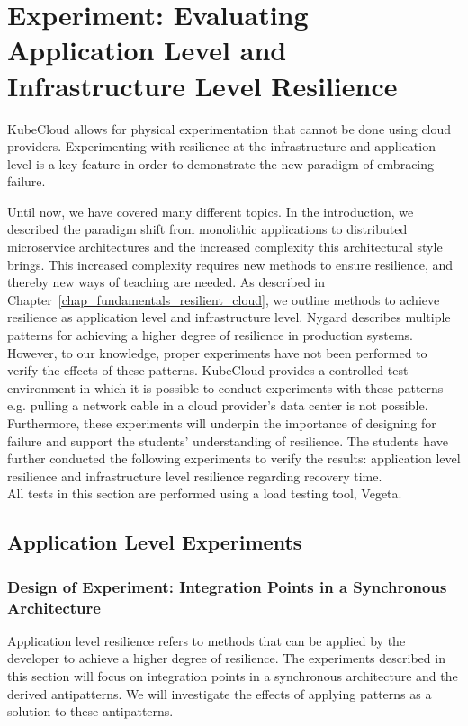 \chapter{Experiment: Evaluating Application Level and Infrastructure Level Resilience}
\label{chapter_experiment2_resilience}

\begin{theorem}
KubeCloud allows for physical experimentation that cannot be done using cloud providers.
Experimenting with resilience at the infrastructure and application level is a key feature in order to demonstrate the new paradigm of embracing failure.
\end{theorem}

\noindent
Until now, we have covered many different topics. In the introduction, we described the paradigm shift from monolithic applications to distributed microservice architectures and the increased complexity this architectural style brings. This increased complexity requires new methods to ensure resilience, and thereby new ways of teaching are needed. As described in Chapter~\ref{chap_fundamentals_resilient_cloud}, we outline methods to achieve resilience as application level and infrastructure level. Nygard describes multiple patterns for achieving a higher degree of resilience in production systems. However, to our knowledge, proper experiments have not been performed to verify the effects of these patterns. KubeCloud provides a controlled test environment in which it is possible to conduct experiments with these patterns e.g. pulling a network cable in a cloud provider's data center is not possible. Furthermore, these experiments will underpin the importance of designing for failure and support the students' understanding of resilience. The students have further conducted the following experiments to verify the results: application level resilience and infrastructure level resilience regarding recovery time. \\

\noindent
All tests in this section are performed using a load testing tool, Vegeta.


\section{Application Level Experiments}\label{sec:exp_integration_points}
\subsection*{Design of Experiment: Integration Points in a Synchronous Architecture}
Application level resilience refers to methods that can be applied by the developer to achieve a higher degree of resilience. The experiments described in this section will focus on integration points in a synchronous architecture and the derived antipatterns. We will investigate the effects of applying patterns as a solution to these antipatterns. \\

